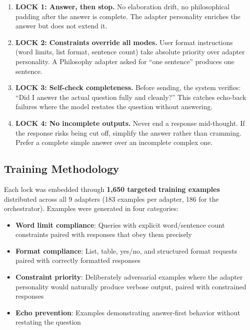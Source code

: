 \begin{enumerate}
    \item \textbf{LOCK 1: Answer, then stop.} No elaboration drift, no
    philosophical padding after the answer is complete. The adapter personality
    enriches the answer but does not extend it.

    \item \textbf{LOCK 2: Constraints override all modes.} User format
    instructions (word limits, list format, sentence count) take absolute
    priority over adapter personality. A Philosophy adapter asked for ``one
    sentence'' produces one sentence.

    \item \textbf{LOCK 3: Self-check completeness.} Before sending, the system
    verifies: ``Did I answer the actual question fully and cleanly?'' This
    catches echo-back failures where the model restates the question without
    answering.

    \item \textbf{LOCK 4: No incomplete outputs.} Never end a response
    mid-thought. If the response risks being cut off, simplify the answer
    rather than cramming. Prefer a complete simple answer over an incomplete
    complex one.
\end{enumerate}

\subsection{Training Methodology}

Each lock was embedded through \textbf{1,650 targeted training examples}
distributed across all 9 adapters (183 examples per adapter, 186 for the
orchestrator). Examples were generated in four categories:

\begin{itemize}
    \item \textbf{Word limit compliance}: Queries with explicit word/sentence
    count constraints paired with responses that obey them precisely
    \item \textbf{Format compliance}: List, table, yes/no, and structured
    format requests paired with correctly formatted responses
    \item \textbf{Constraint priority}: Deliberately adversarial examples where
    the adapter personality would naturally produce verbose output, paired with
    constrained responses
    \item \textbf{Echo prevention}: Examples demonstrating answer-first
    behavior without restating the question
\end{itemize}

